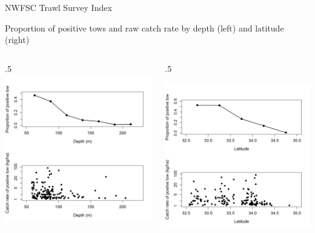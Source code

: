 \documentclass[ignorenonframetext,]{beamer}
\def\begincols{\begin{columns}}
\def\begincol{\begin{column}}
\def\endcol{\end{column}}
\def\endcols{\end{columns}}
\begin{document}
\begin{frame}{NWFSC Trawl Survey Index}

Proportion of positive tows and raw catch rate by depth (left) and
latitude (right) \begincols
 \begincol{.5\textwidth} \centering
\includegraphics{Figures/NWFSCtrawl_posdepth.png}

\endcol
 \begincol{.5\textwidth}

\includegraphics{Figures/NWFSCtrawl_poslat.png}

\endcol
\endcols

\end{frame}
\end{document}
